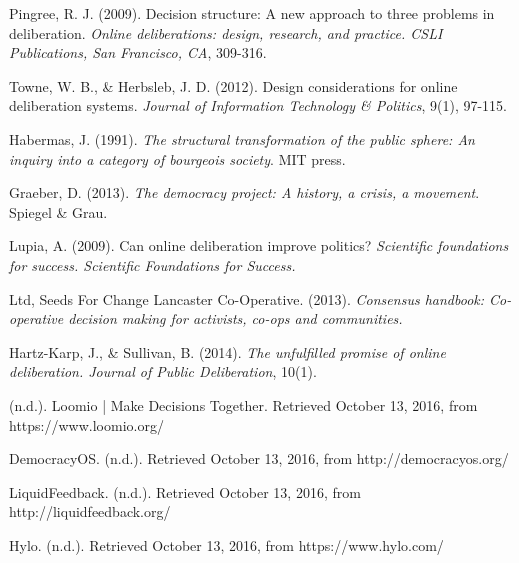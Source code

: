 \documentclass{article}
\begin{document}
\begin{thebibliography}{9}

Pingree, R. J. (2009). Decision structure: A new approach to three problems in deliberation. \textit{Online deliberations: design, research, and practice. CSLI Publications, San Francisco, CA}, 309-316.

Towne, W. B., \& Herbsleb, J. D. (2012). Design considerations for online deliberation systems. \textit{Journal of Information Technology \& Politics}, 9(1), 97-115.

Habermas, J. (1991). \textit{The structural transformation of the public sphere: An inquiry into a category of bourgeois society}. MIT press.

Graeber, D. (2013). \textit{The democracy project: A history, a crisis, a movement}. Spiegel \& Grau.

Lupia, A. (2009). Can online deliberation improve politics? \textit{Scientific foundations for success. Scientific Foundations for Success.}

Ltd, Seeds For Change Lancaster Co-Operative. (2013). \textit{Consensus handbook: Co-operative decision making for activists, co-ops and communities.}

Hartz-Karp, J., \& Sullivan, B. (2014). \textit{The unfulfilled promise of online deliberation. Journal of Public Deliberation}, 10(1).

(n.d.). Loomio | Make Decisions Together. Retrieved October 13, 2016, from https://www.loomio.org/

DemocracyOS. (n.d.). Retrieved October 13, 2016, from http://democracyos.org/

LiquidFeedback. (n.d.). Retrieved October 13, 2016, from http://liquidfeedback.org/

Hylo. (n.d.). Retrieved October 13, 2016, from https://www.hylo.com/


\end{thebibliography}
\end{document}
